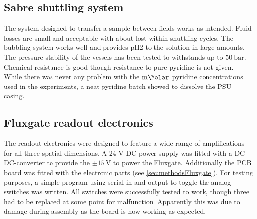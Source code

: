 	\subsection{Sabre shuttling system}
		The system designed to transfer a sample between fields works as intended. Fluid losses are
		small and acceptable with about  lost within  shuttling cycles. The
		bubbling system works well and provides pH2 to the solution in large amounts. The pressure
		stability of the vessels has been tested to withstands up to $\SI{50}{\bar}$. Chemical
		resistance is good though resistance to pure pyridine is not given. While there was never
		any problem with the $\SI{}{\milli\Molar}$ pyridine concentrations used in the experiments, a
		neat pyridine batch showed to dissolve the PSU casing.
	\subsection{Fluxgate readout electronics}
		The readout electronics were designed to feature a wide range of amplifications for all
		three spatial dimensions. A 24 V DC power supply was fitted with a DC-DC-converter to
		provide the $\pm\SI{15}{\volt}$ to power the Fluxgate. Additionally the PCB board was fitted
		with the electronic parts (see \ref{sec:methodsFluxgate}). For testing purposes, a simple program
		using serial in and output to toggle the analog switches was written. All switches were
		successfully tested to work, though three had to be replaced at some point for malfunction.
		Apparently this was due to damage during assembly as the board is now working as expected.

